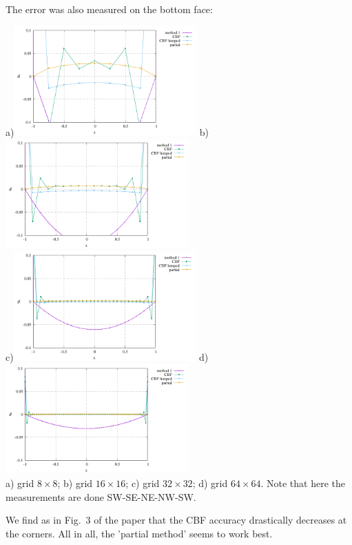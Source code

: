 The error was also measured on the bottom face:
\begin{center}
a)\includegraphics[width=7cm]{python_codes/fieldstone_173/results/exp2/8x8/heat_flux_boundary_bottom.pdf}
b)\includegraphics[width=7cm]{python_codes/fieldstone_173/results/exp2/16x16/heat_flux_boundary_bottom.pdf}\\
c)\includegraphics[width=7cm]{python_codes/fieldstone_173/results/exp2/32x32/heat_flux_boundary_bottom.pdf}
d)\includegraphics[width=7cm]{python_codes/fieldstone_173/results/exp2/64x64/heat_flux_boundary_bottom.pdf}\\
{\captionfont a) grid $8\times 8$; b) grid $16\times 16$;
c) grid $32\times 32$; d) grid $64\times 64$. 
Note that here the measurements are done SW-SE-NE-NW-SW.}
\end{center}

We find as in Fig.~3 of the paper that the CBF accuracy drastically decreases at the corners.
All in all, the 'partial method' seems to work best.







